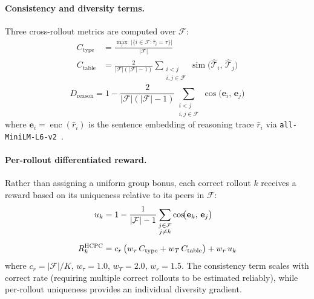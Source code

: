 \documentclass[11pt]{article}
\newcommand{\hcpc}{\textsc{HCPC}}
\begin{document}
\paragraph{Consistency and diversity terms.}
Three cross-rollout metrics are computed over $\mathcal{F}$:
%
\begin{equation}
\begin{aligned}
  C_\text{type}  &= \frac{
    \max_{\tau}\;\bigl|\{i \in \mathcal{F} : \hat{\tau}_i = \tau\}\bigr|
  }{|\mathcal{F}|} \\[6pt]
  C_\text{table} &= \frac{2}{|\mathcal{F}|(|\mathcal{F}|-1)}
                    \sum_{\substack{i < j \\ i,j \in \mathcal{F}}}
                    \operatorname{sim}\!\bigl(\hat{\mathcal{T}}_i,\, \hat{\mathcal{T}}_j\bigr)
\end{aligned}
\label{eq:consistency}
\end{equation}
%
\begin{equation}
  D_\text{reason} = 1 - \frac{2}{|\mathcal{F}|(|\mathcal{F}|-1)}
    \sum_{\substack{i < j \\ i,j \in \mathcal{F}}}
    \cos\!\bigl(\mathbf{e}_i,\, \mathbf{e}_j\bigr)
  \label{eq:diversity}
\end{equation}
%
where $\mathbf{e}_i = \operatorname{enc}(\hat{r}_i)$ is the sentence embedding of
reasoning trace $\hat{r}_i$ via \texttt{all-MiniLM-L6-v2}~\citep{reimers2019sbert}.

\paragraph{Per-rollout differentiated reward.}
Rather than assigning a uniform group bonus, each correct rollout $k$ receives a
reward based on its uniqueness relative to its peers in $\mathcal{F}$:
%
\begin{equation}
\begin{aligned}
  u_k &= 1 - \frac{1}{|\mathcal{F}|-1}
             \sum_{\substack{j \in \mathcal{F} \\ j \neq k}}
             \cos\!\bigl(\mathbf{e}_k,\, \mathbf{e}_j\bigr) \\[6pt]
  R_k^{\hcpc} &= c_r\,\bigl(w_\tau\, C_\text{type}
                            + w_T\, C_\text{table}\bigr)
                + w_r\, u_k
\end{aligned}
\label{eq:reward}
\end{equation}
%
where $c_r = |\mathcal{F}|/K$, $w_\tau = 1.0$, $w_T = 2.0$, $w_r = 1.5$.
The consistency term scales with correct rate (requiring multiple correct rollouts
to be estimated reliably), while per-rollout uniqueness provides an individual
diversity gradient.
\end{document}
